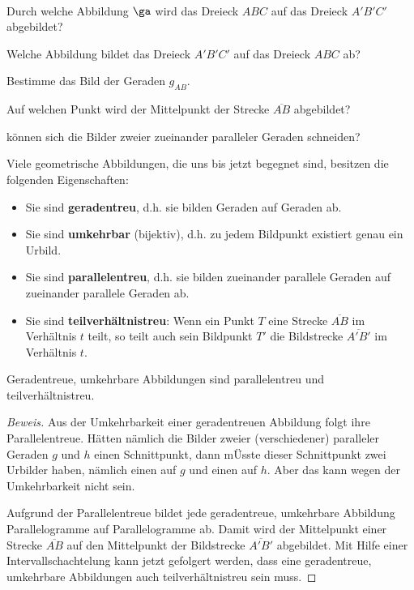 \documentclass[%
11pt,%
twoside,%
titlepage,%
german,%
headsepline%
]{scrartcl}
\begin{document}
\begin{ueb}
\ \\[-4ex]
\begin{enumeratea}
\item Durch welche Abbildung $\ga$ wird das Dreieck $ABC$ auf das Dreieck $A'B'C'$ abgebildet?
\item Welche Abbildung bildet das Dreieck $A'B'C'$ auf das Dreieck $ABC$ ab?
\item Bestimme das Bild der Geraden $g_{AB}$.
\item Auf welchen Punkt wird der Mittelpunkt der Strecke $\overline{AB}$ abgebildet?
\item können sich die Bilder zweier zueinander paralleler Geraden schneiden?
\end{enumeratea}
\end{ueb}

Viele geometrische Abbildungen, die uns bis jetzt begegnet sind, besitzen die folgenden Eigenschaften:
\begin{itemize}
\item Sie sind \textbf{geradentreu}, d.h. sie bilden Geraden auf Geraden ab.
\item Sie sind \textbf{umkehrbar} (bijektiv), d.h. zu jedem Bildpunkt existiert genau ein Urbild.
\item Sie sind \textbf{parallelentreu}, d.h. sie bilden zueinander parallele Geraden auf zueinander parallele Geraden ab.
\item Sie sind \textbf{teilverhältnistreu}: Wenn ein Punkt $T$ eine Strecke $\overline{AB}$ im Verhältnis $t$ teilt, so teilt auch sein Bildpunkt $T'$ die Bildstrecke $\overline{A'B'}$ im Verhältnis $t$.
\end{itemize}

\begin{satz}
Geradentreue, umkehrbare Abbildungen sind parallelentreu und teilverhältnistreu.
\end{satz}

\begin{proof}[Beweis]
Aus der Umkehrbarkeit einer geradentreuen Abbildung folgt ihre Parallelentreue. Hätten nämlich die Bilder zweier (verschiedener) paralleler Geraden $g$ und $h$ einen Schnittpunkt, dann m\"Usste dieser Schnittpunkt zwei Urbilder haben, nämlich einen auf $g$ und einen auf $h$. Aber das kann wegen der Umkehrbarkeit nicht sein.

Aufgrund der Parallelentreue bildet jede geradentreue, umkehrbare Abbildung Parallelogramme auf Parallelogramme ab. Damit wird der Mittelpunkt einer Strecke $\overline{AB}$ auf den Mittelpunkt der Bildstrecke $\overline{A'B'}$ abgebildet. Mit Hilfe einer Intervallschachtelung kann jetzt gefolgert werden, dass eine geradentreue, umkehrbare Abbildungen auch teilverhältnistreu sein muss.
\end{proof}
\end{document}
